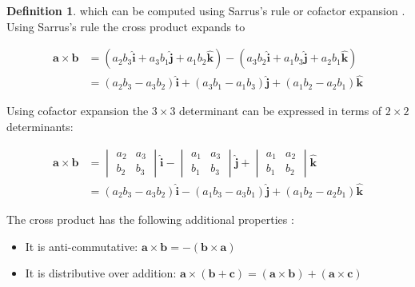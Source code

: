 \documentclass{article}
\theoremstyle{definition}
\newtheorem{definition}{Definition}[section]
\begin{document}
\begin{definition}
\bigskip
\noindent
which can be computed using Sarrus's rule
\cite{wiki:rule_of_sarrus} or cofactor expansion
\cite{cofactor_expansion}. Using Sarrus's rule the cross product
expands to

\bigskip
\begin{equation*}
\begin{aligned}
\mathbf{a\times b} 
&= (a_{2} b_{3} \mathbf{\hat{i}} + a_{3}b_{1} \mathbf{\hat{j}} + a_{1}b_{2} \mathbf{\hat{k}})
-  (a_{3}b_{2}\mathbf{\hat{i}} + a_{1}b_{3}\mathbf{\hat{j}} + a_{2}b_{1}\mathbf{\hat{k}}) \\
&= (a_{2}b_{3} - a_{3}b_{2}) \mathbf{\hat{i}} + ( a_{3}b_{1} - a_{1}b_{3})
\mathbf{\hat{j}} + ( a_{1}b_{2} - a_{2}b_{1} ) \mathbf{\hat{k}} 
\end{aligned}
\end{equation*}

\bigskip
\noindent
Using cofactor expansion the $3 \times 3$ determinant can be 
expressed in terms of $2 \times 2$ determinants:

\bigskip
\begin{equation*}
\begin{aligned}
\mathbf {a\times b} 
&= {\begin{vmatrix}
     a_{2} & a_{3} \\
     b_{2} & b_{3}
    \end{vmatrix}}
    \mathbf{\hat{i}} - 
    {\begin{vmatrix}
      a_{1} & a_{3} \\
      b_{1} & b_{3}
     \end{vmatrix}}
    \mathbf{\hat{j}} +
    {\begin{vmatrix}
      a_{1} & a_{2} \\
      b_{1} & b_{2}
     \end{vmatrix}}
     \mathbf{\hat{k}} \\
&= (a_{2}b_{3} - a_{3}b_{2}) \mathbf{\hat{i}} - 
   (a_{1}b_{3} - a_{3}b_{1}) \mathbf{\hat{j}} +
   (a_{1}b_{2} - a_{2}b_{1}) \mathbf{\hat{k}}
\end{aligned}
\end{equation*}


\bigskip
\noindent
The cross product has the following additional properties \cite{wiki:cross_product}:


\begin{itemize}
\item It is anti-commutative: $\mathbf{a} \times \mathbf{b} 
= - (\mathbf{b} \times \mathbf{a})$


\item It is distributive over addition: $\mathbf{a} \times
(\mathbf{b} + \mathbf{c}) = (\mathbf{a} \times \mathbf{b}) +
(\mathbf{a} \times \mathbf{c})$



\end{itemize}
\end{definition}
\end{document}

